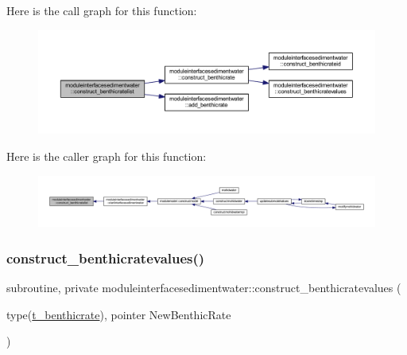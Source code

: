 Here is the call graph for this function\+:\nopagebreak
\begin{figure}[H]
\begin{center}
\leavevmode
\includegraphics[width=350pt]{namespacemoduleinterfacesedimentwater_a4713df4000135a16a6b464063f75fe72_cgraph}
\end{center}
\end{figure}
Here is the caller graph for this function\+:\nopagebreak
\begin{figure}[H]
\begin{center}
\leavevmode
\includegraphics[width=350pt]{namespacemoduleinterfacesedimentwater_a4713df4000135a16a6b464063f75fe72_icgraph}
\end{center}
\end{figure}
\mbox{\label{namespacemoduleinterfacesedimentwater_a6172f96194c964b013cd855127df7b8d}} 
\subsubsection{\texorpdfstring{construct\+\_\+benthicratevalues()}{construct\_benthicratevalues()}}
{\footnotesize\ttfamily subroutine, private moduleinterfacesedimentwater\+::construct\+\_\+benthicratevalues (\begin{DoxyParamCaption}\item[{type(\mbox{\hyperlink{structmoduleinterfacesedimentwater_1_1t__benthicrate}{t\+\_\+benthicrate}}), pointer}]{New\+Benthic\+Rate }\end{DoxyParamCaption})\hspace{0.3cm}{\ttfamily [private]}}

